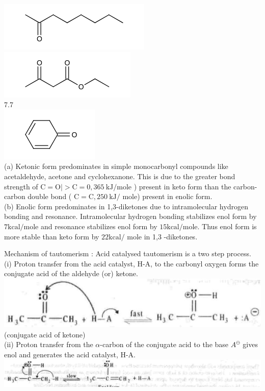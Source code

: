 \documentclass[10pt]{article}
\begin{document}
\includegraphics{smile-39590f47d2f5a135fc228231450cc0c21f0f3b9b}\\
\includegraphics{smile-fc0ac3ad732bb63b35b621604d277d0927e872a6}\\
7.7\\
\includegraphics{smile-6a03306e45ef6936e94ad718bc3997e467d5a54f}\\
(a) Ketonic form predominates in simple monocarbonyl compounds like acetaldehyde, acetone and cyclohexanone. This is due to the greater bond strength of $\mathrm{C}=\mathrm{O} \mid>\mathrm{C}=0,365 \mathrm{~kJ} / \mathrm{mole}$ ) present in keto form than the carbon-carbon double bond ( $\mathrm{C}=\mathrm{C}, 250 \mathrm{~kJ} /$ mole) present in enolic form.\\
(b) Enolic form predominates in 1,3-diketones due to intramolecular hydrogen bonding and resonance. Intramolecular hydrogen bonding stabilizes enol form by $7 \mathrm{kcal} / \mathrm{mole}$ and resonance stabilizes enol form by $15 \mathrm{kcal} / \mathrm{mole}$. Thus enol form is more stable than keto form by $22 \mathrm{kcal} /$ mole in 1,3 -diketones.

Mechanism of tautomerism : Acid catalysed tautomerism is a two step process.\\
(i) Proton transfer from the acid catalyst, H-A, to the carbonyl oxygen forms the conjugate acid of the aldehyde (or) ketone.\\
\includegraphics[max width=\textwidth, center]{2025_01_28_8470952b98110cec3aabg-044}\\
(conjugate acid of ketone)\\
(ii) Proton transfer from the $\alpha$-carbon of the conjugate acid to the base $A^{\ominus}$ gives enol and generates the acid catalyst, H-A.\\
\includegraphics[max width=\textwidth, center]{2025_01_28_8470952b98110cec3aabg-044(2)}
\end{document}
